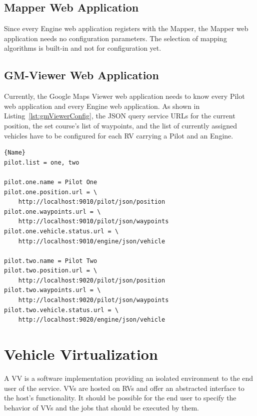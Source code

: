 \subsection{Mapper Web Application}
Since every Engine web application registers with the Mapper, the Mapper web application needs no
configuration parameters. The selection of mapping algorithms is built-in and not for configuration yet.



\subsection{GM-Viewer Web Application}
Currently, the Google Maps Viewer web application needs to know every Pilot web application
and every Engine web application. As shown in Listing~\ref{lst:gmViewerConfig}, the \acs{JSON} \cite{RFC_4627}
query service \acsp{URL} for the current position, the set course's list of waypoints, and the  
list of currently assigned vehicles have to be configured for each \ac{RV} carrying a Pilot and an Engine.   

\lstset{tabsize=3,language=Tex}
\begin{lstlisting}[caption={Google Maps Viewer Configuration Example},mathescape=true,label=lst:gmViewerConfig]{Name}
pilot.list = one, two

pilot.one.name = Pilot One
pilot.one.position.url = \
	http://localhost:9010/pilot/json/position
pilot.one.waypoints.url = \
	http://localhost:9010/pilot/json/waypoints
pilot.one.vehicle.status.url = \
	http://localhost:9010/engine/json/vehicle

pilot.two.name = Pilot Two
pilot.two.position.url = \
	http://localhost:9020/pilot/json/position
pilot.two.waypoints.url = \
	http://localhost:9020/pilot/json/waypoints
pilot.two.vehicle.status.url = \
	http://localhost:9020/engine/json/vehicle
\end{lstlisting}





\section{Vehicle Virtualization}

A \acf{VV} is a software implementation providing an isolated environment to the end user of the service. \acp{VV} are
hosted on \acfp{RV} and offer an abstracted interface to the host's functionality. It should be possible for the end
user to specify the behavior of \acp{VV} and the jobs that should be executed by them.

